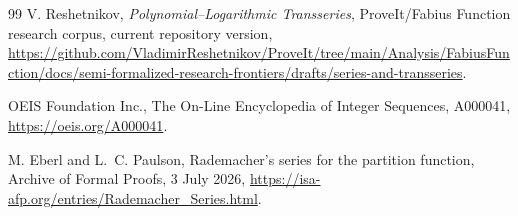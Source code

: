 \documentclass[11pt,a4paper]{article}
\numberwithin{equation}{section}
\theoremstyle{definition}
\theoremstyle{remark}
\begin{document}
\begin{thebibliography}{99}
V. Reshetnikov,
\newblock \emph{Polynomial--Logarithmic Transseries},
\newblock ProveIt/Fabius Function research corpus, current repository version,
\newblock \url{https://github.com/VladimirReshetnikov/ProveIt/tree/main/Analysis/FabiusFunction/docs/semi-formalized-research-frontiers/drafts/series-and-transseries}.

OEIS Foundation Inc.,
\newblock The On-Line Encyclopedia of Integer Sequences, A000041,
\newblock \url{https://oeis.org/A000041}.

M. Eberl and L.~C. Paulson,
\newblock Rademacher's series for the partition function,
\newblock Archive of Formal Proofs, 3 July 2026,
\newblock \url{https://isa-afp.org/entries/Rademacher_Series.html}.

\end{thebibliography}
\endgroup
\end{document}
